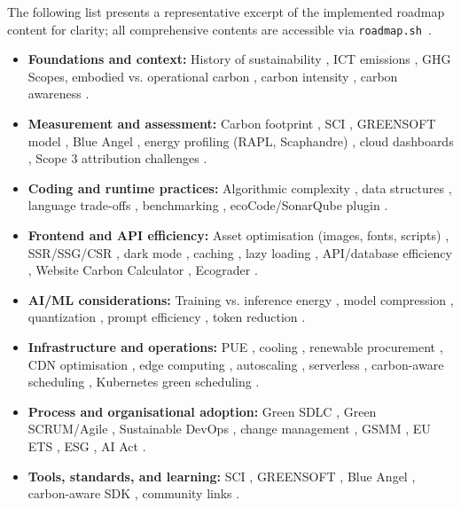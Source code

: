 \documentclass[english]{lni}
\begin{document}
The following list presents a representative excerpt of the implemented roadmap content for clarity; all comprehensive contents are accessible via \texttt{roadmap.sh}~\cite{roadmaprelease}.
\begin{itemize}
    \item \textbf{Foundations and context:} History of sustainability \citep{Me72}, ICT emissions \citep{Fr21}, GHG Scopes\citep{NR04}, embodied vs. operational carbon \citep{GH24}, carbon intensity \citep{GC24}, carbon awareness \citep{GC24}.
    
    \item \textbf{Measurement and assessment:} Carbon footprint \citep{NR04}, SCI \citep{SC24}, GREENSOFT model \citep{NA11}, Blue Angel \citep{NA21}, energy profiling (RAPL, Scaphandre) \citep{KN18}, cloud dashboards \citep{AW26}, Scope 3 attribution challenges \citep{GH13}.
    
    \item \textbf{Coding and runtime practices:} Algorithmic complexity \citep{Ca24}, data structures \citep{Ha18}, language trade-offs \citep{Va25}, benchmarking \citep{Pe21}, ecoCode/SonarQube plugin \citep{CC26}.
    
    \item \textbf{Frontend and API efficiency:} Asset optimisation (images, fonts, scripts) \citep{MD26}, SSR/SSG/CSR \citep{OJ19}, dark mode \citep{PH21}, caching \citep{Ka21}, lazy loading \citep{Fo03}, API/database efficiency \citep{Mi26}, Website Carbon Calculator \citep{WD19}, Ecograder \citep{Ec23}.
    
    \item \textbf{AI/ML considerations:} Training vs. inference energy \citep{St19}, model compression \citep{Pi24}, quantization \citep{Gh21}, prompt efficiency \cite{PG26}, token reduction \citep{Ar24}.
    
    \item \textbf{Infrastructure and operations:} PUE \citep{He21}, cooling \citep{AS24}, renewable procurement \citep{RE26}, CDN optimisation \citep{Cl26}, edge computing \citep{KR23}, autoscaling \citep{Ve25}, serverless \citep{Ca25}, carbon-aware scheduling \citep{GT24}, Kubernetes green scheduling \citep{CA26}.
    
    \item \textbf{Process and organisational adoption:} Green SDLC \citep{Na10}, Green SCRUM/Agile \citep{GA25}, Sustainable DevOps \citep{Ai25}, change management \citep{AN22}, GSMM \citep{GM25}, EU ETS \cite{ET26}, ESG \citep{Ga26}, AI Act \citep{EA24}.
    
    \item \textbf{Tools, standards, and learning:} SCI \citep{SC24}, GREENSOFT \citep{NA11}, Blue Angel \citep{NA21}, carbon-aware SDK \citep{CA26}, community links \citep{La25}.
\end{itemize}
\end{document}
